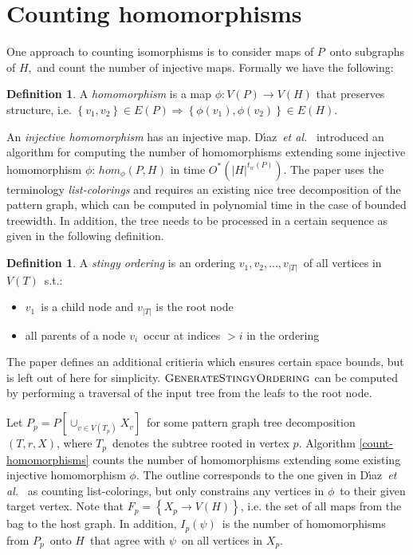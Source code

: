 \documentclass[a4paper,11pt]{report}
\theoremstyle{plain}
\theoremstyle{definition}
\newtheorem{defn}[thm]{Definition} %
\begin{document}
\section{Counting homomorphisms}
\label{section:injhomo}
One approach to counting isomorphisms is to consider maps of $P$ onto subgraphs of $H$, and count the number of injective maps.
Formally we have the following:

\begin{defn}
A \emph{homomorphism} is a map $\phi : V(P) \rightarrow V(H)$ that preserves structure,
i.e. $\left\{v_1, v_2\right\} \in E(P) \Rightarrow \left\{\phi(v_1), \phi(v_2)\right\} \in E(H)$.
\end{defn}


An \emph{injective homomorphism} has an injective map.
D{\'{\i}}az~{\em et al.}~\cite{DST02} introduced an algorithm for computing the number of homomorphisms extending some injective homomorphism $\phi$: $hom_{\phi}(P, H)$ in time $O^*(|H|^{t_w(P)})$.
The paper uses the terminology \emph{list-colorings} and requires an existing nice tree decomposition of the pattern graph, which can be computed in polynomial time in the case of bounded treewidth.
In addition, the tree needs to be processed in a certain sequence as given in the following definition.

\begin{defn}
A \emph{stingy ordering} is an ordering $v_1, v_2, ..., v_{|T|}$ of all vertices in $V(T)$ s.t.:
\begin{itemize}
\item $v_1$ is a child node and $v_{|T|}$ is the root node
\item all parents of a node $v_i$ occur at indices $>i$ in the ordering
\end{itemize}
\end{defn}

The paper defines an additional critieria which ensures certain space bounds, but is left out of here for simplicity.
$\textsc{GenerateStingyOrdering}$ can be computed by performing a traversal of the input tree from the leafs to the root node.

Let $P_p = P[\cup_{v \in V(T_p)} X_v]$ for some pattern graph tree decomposition $(T, r, X)$, where $T_p$ denotes the subtree rooted in vertex $p$.
Algorithm \ref{count-homomorphisms} counts the number of homomorphisms extending some existing injective homomorphism $\phi$.
The outline corresponds to the one given in D{\'{\i}}az~{\em et al.}~\cite{DST02} as counting list-colorings, but only constrains any vertices in $\phi$ to their given target vertex.
Note that $F_p = \left\{X_p \rightarrow V(H)\right\}$, i.e. the set of all maps from the bag to the host graph.
In addition, $I_p(\psi)$ is the number of homomorphisms from $P_p$ onto $H$ that agree with $\psi$ on all vertices in $X_p$.
\end{document}

